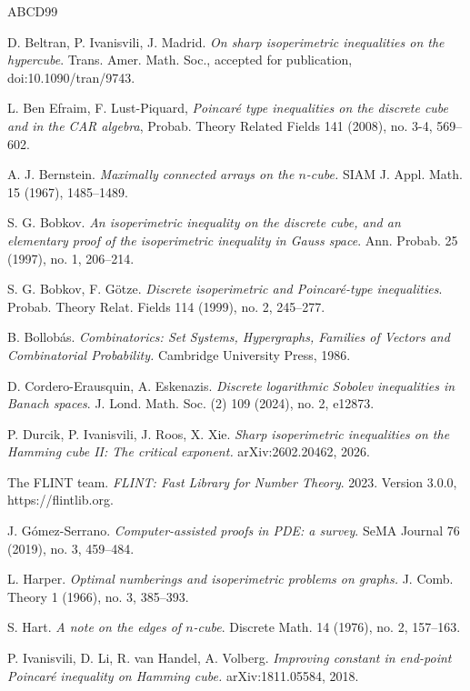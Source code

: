 \documentclass[12pt]{amsart}
\theoremstyle{plain}
\theoremstyle{definition}
\theoremstyle{remark}
\numberwithin{equation}{section}
\begin{document}
\begin{thebibliography}{ABCD99}


D. Beltran, P. Ivanisvili, J. Madrid. {\em On sharp isoperimetric inequalities on the hypercube}. Trans. Amer. Math. Soc., accepted for publication,
doi:10.1090/tran/9743.

 L. Ben Efraim, F. Lust-Piquard, {\em Poincar\'e type inequalities on the discrete cube and in the CAR algebra}, Probab. Theory Related Fields 141 (2008), no. 3-4, 569--602.

 A. J. Bernstein. \emph{Maximally connected arrays on the $n$-cube.} SIAM J. Appl. Math. 15 (1967), 1485--1489.

 S. G. Bobkov.
{\em An isoperimetric inequality on the discrete cube, and an elementary proof of the isoperimetric inequality in Gauss space}.  Ann. Probab. 25 (1997), no. 1, 206--214.
 
S. G. Bobkov, F. G{\"o}tze. {\em Discrete isoperimetric and Poincar{\'e}-type inequalities}. Probab. Theory Relat. Fields 114 (1999), no. 2, 245--277.

B. Bollob\'{a}s. {\em Combinatorics: Set Systems, Hypergraphs, Families of Vectors and Combinatorial Probability.} Cambridge University Press, 1986.

 D. Cordero-Erausquin, A. Eskenazis. {\em Discrete logarithmic Sobolev inequalities in Banach spaces}. J. Lond. Math. Soc. (2) 109 (2024), no. 2, e12873.

 P. Durcik, P. Ivanisvili, J. Roos, X. Xie. {\em Sharp isoperimetric inequalities on the Hamming cube II: The critical exponent.} arXiv:2602.20462, 2026.

 The FLINT team. {\em FLINT: Fast Library for Number Theory}. 2023. Version 3.0.0, https://flintlib.org.

 J. G\'omez-Serrano. \emph{Computer-assisted proofs in PDE: a survey}.
SeMA Journal 76 (2019), no. 3, 459--484.

 L. Harper. {\em Optimal numberings and isoperimetric problems on graphs.} J. Comb. Theory 1 (1966), no. 3, 385--393.

 S. Hart. {\em A note on the edges of $n$-cube}. Discrete Math. 14 (1976), no. 2, 157--163.


P. Ivanisvili, D. Li, R. van Handel, A. Volberg.
{\em Improving constant in end-point Poincaré inequality on Hamming cube.} arXiv:1811.05584, 2018.


\end{thebibliography}
\end{document}
